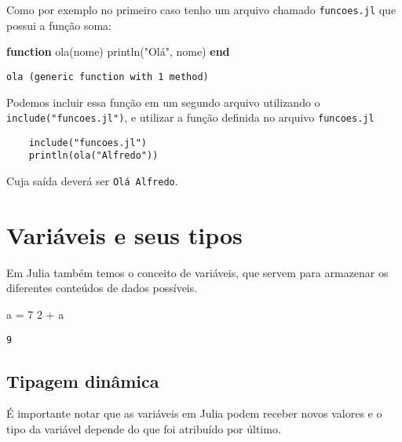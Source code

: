 \documentclass[
  letterpaper,
  DIV=11,
  numbers=noendperiod]{scrreprt}
\newenvironment{Shaded}{\begin{snugshade}}{\end{snugshade}}
\newcommand{\FloatTok}[1]{\textcolor[rgb]{0.68,0.00,0.00}{#1}}
\newcommand{\FunctionTok}[1]{\textcolor[rgb]{0.28,0.35,0.67}{#1}}
\newcommand{\KeywordTok}[1]{\textcolor[rgb]{0.00,0.23,0.31}{\textbf{#1}}}
\newcommand{\NormalTok}[1]{\textcolor[rgb]{0.00,0.23,0.31}{#1}}
\newcommand{\OperatorTok}[1]{\textcolor[rgb]{0.37,0.37,0.37}{#1}}
\newcommand{\StringTok}[1]{\textcolor[rgb]{0.13,0.47,0.30}{#1}}
\begin{document}
Como por exemplo no primeiro caso tenho um arquivo chamado
\texttt{funcoes.jl} que possui a função soma:

\begin{Shaded}
\begin{Highlighting}[]
\KeywordTok{function} \FunctionTok{ola}\NormalTok{(nome)}
    \FunctionTok{println}\NormalTok{(}\StringTok{"Olá"}\NormalTok{, nome)}
\KeywordTok{end}
\end{Highlighting}
\end{Shaded}

\begin{verbatim}
ola (generic function with 1 method)
\end{verbatim}

Podemos incluir essa função em um segundo arquivo utilizando o
\texttt{include("funcoes.jl")}, e utilizar a função definida no arquivo
\texttt{funcoes.jl}

\begin{verbatim}
    include("funcoes.jl")
    println(ola("Alfredo"))  
\end{verbatim}

Cuja saída deverá ser \texttt{Olá\ Alfredo}.

\section{Variáveis e seus tipos}\label{variuxe1veis-e-seus-tipos}

Em Julia também temos o conceito de variáveis, que servem para armazenar
os diferentes conteúdos de dados possíveis.

\begin{Shaded}
\begin{Highlighting}[]
\NormalTok{a }\OperatorTok{=} \FloatTok{7}
\FloatTok{2} \OperatorTok{+}\NormalTok{ a}
\end{Highlighting}
\end{Shaded}

\begin{verbatim}
9
\end{verbatim}

\subsection{Tipagem dinâmica}\label{tipagem-dinuxe2mica}

É importante notar que as variáveis em Julia podem receber novos valores
e o tipo da variável depende do que foi atribuído por último.
\end{document}
